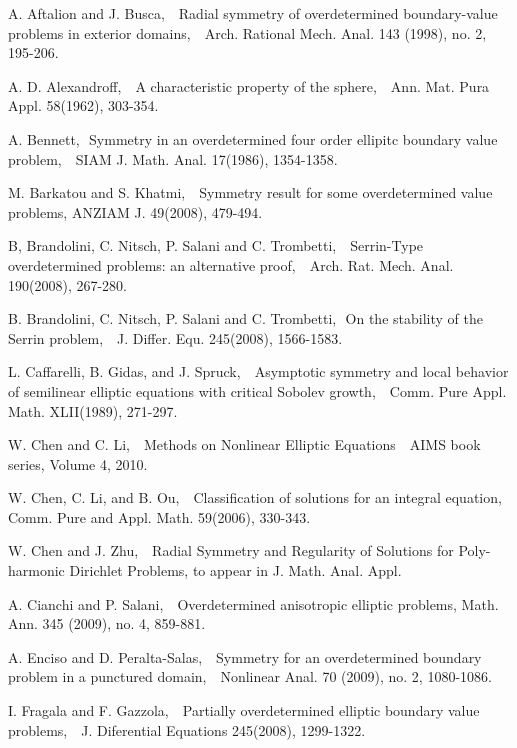 \documentclass[12pt]{amsproc}
\theoremstyle{plain}
\numberwithin{equation}{section}
\begin{document}
\begin{thebibliography}{CL}

 A. Aftalion and J.  Busca, \,\, Radial symmetry of overdetermined boundary-value problems in exterior domains, \,\, Arch. Rational Mech. Anal. 143 (1998), no. 2, 195-206.

 A. D. Alexandroff, \,\, A characteristic property
of the sphere, \,\, Ann. Mat. Pura Appl. 58(1962), 303-354.

 A. Bennett,\,\, Symmetry in an overdetermined four
order ellipitc boundary value problem, \,\, SIAM J. Math. Anal.
17(1986), 1354-1358.

 M. Barkatou and S. Khatmi, \,\, Symmetry result for some overdetermined value problems,
ANZIAM J. 49(2008), 479-494.

 B, Brandolini, C. Nitsch, P. Salani and C.
Trombetti, \,\, Serrin-Type overdetermined problems: an alternative
proof, \,\,  Arch. Rat. Mech. Anal. 190(2008), 267-280.

 B. Brandolini, C. Nitsch, P. Salani and C.   Trombetti,\,\,  On the stability of the Serrin problem, \,\, J. Differ.
Equ. 245(2008), 1566-1583.

  L. Caffarelli, B. Gidas, and J. Spruck, \,\,
Asymptotic symmetry and local behavior of semilinear elliptic
equations with critical Sobolev growth, \,\, Comm. Pure Appl. Math.
 XLII(1989), 271-297.

 W. Chen and C. Li, \,\, Methods on Nonlinear Elliptic Equations \,\, AIMS book series, Volume 4, 2010.

 W. Chen, C. Li, and B. Ou, \,\, Classification
of solutions for an integral equation,  \,\, Comm. Pure and Appl.
Math. 59(2006), 330-343.

 W. Chen and J. Zhu, \,\, Radial Symmetry and Regularity of Solutions for Poly-harmonic Dirichlet
Problems, to appear in J. Math. Anal. Appl.

A. Cianchi and P. Salani,  \,\, Overdetermined anisotropic elliptic
problems, Math. Ann. 345 (2009), no. 4, 859-881.

 A. Enciso and D. Peralta-Salas, \,\, Symmetry for an overdetermined boundary problem in a punctured domain, \,\, Nonlinear Anal. 70 (2009), no. 2, 1080-1086.

 I. Fragala and F. Gazzola, \,\, Partially overdetermined elliptic
boundary value problems, \,\, J. Diferential Equations 245(2008),
1299-1322.


\end{thebibliography}
\end{document}
